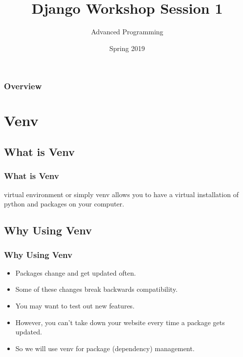 \documentclass{beamer}
\title[Django Workshop]{Django Workshop Session 1} %
\author{Advanced Programming} %
\institute[AUT] %
{
	Amirkabir University of Technology\\ %
	\medskip
	\textit{} %
}
\date{Spring 2019} %
\begin{document}
	
	\begin{frame}
		\titlepage %
	\end{frame}

	\begin{frame}
	\frametitle{Overview} %
	\tableofcontents %
	\end{frame}


\section{Venv}
\subsection{What is Venv} 
\begin{frame}
\frametitle{What is Venv}
	virtual environment or simply venv allows you to have a virtual installation of python and packages on your computer.
\end{frame}

\subsection{Why Using Venv}
\begin{frame}
\frametitle{Why Using Venv}
\begin{itemize}
	\item Packages change and get updated often.
	\item Some of these changes break backwards compatibility.
	\item You may want to test out new features.
	\item However, you can't take down your website every time a package gets updated.
	\item So we will use venv for package (dependency) management.
\end{itemize}
\end{frame}
\end{document}

